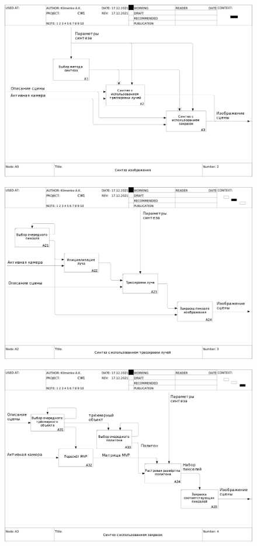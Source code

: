 \begin{figure}
    \centering
    \includegraphics[width=\linewidth,height=\textheight,keepaspectratio]{idef0/02_A0.jpg}
\end{figure}

\begin{figure}
    \centering
    \includegraphics[width=\linewidth,height=\textheight,keepaspectratio]{idef0/03_A2.jpg}
\end{figure}

\begin{figure}
    \centering
    \includegraphics[width=\linewidth,height=\textheight,keepaspectratio]{idef0/04_A3.jpg}
\end{figure}

